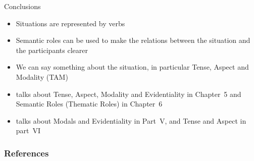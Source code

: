 \documentclass{beamer}
\title[Distributional]{}
\begin{document}
\maketitle


%
%

\begin{frame}{Conclusions}

\begin{itemize}
\item Situations are represented by verbs
\item Semantic roles can be used to make the relations between the situation and the participants clearer
\item We can say something about the situation, in particular Tense, Aspect and Modality (TAM)
\item \citet{Saeed:2015} talks about Tense, Aspect, Modality and Evidentiality in Chapter~5 and Semantic Roles (Thematic Roles) in  Chapter~6
\item  \citet{Kroeger:2022} talks about Modals and Evidentiality in Part~V, and Tense and Aspect in part~VI
\end{itemize}
\end{frame}



\begin{frame}[allowframebreaks]
  \frametitle{References}
  
  
\end{frame}


\end{document}
